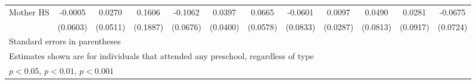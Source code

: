 \begin{table}[htbp]
\begin{tabular}{l*{11}{c}}
\addlinespace
Mother HS   &     -0.0005         &      0.0270         &      0.1606         &     -0.1062         &      0.0397         &      0.0665         &     -0.0601         &      0.0097         &      0.0490         &      0.0281         &     -0.0675         \\
            &    (0.0603)         &    (0.0511)         &    (0.1887)         &    (0.0676)         &    (0.0400)         &    (0.0578)         &    (0.0833)         &    (0.0287)         &    (0.0813)         &    (0.0917)         &    (0.0724)         \\
\bottomrule
\multicolumn{12}{l}{\footnotesize Standard errors in parentheses}\\
\multicolumn{12}{l}{\footnotesize Estimates shown are for individuals that attended any preschool, regardless of type}\\
\multicolumn{12}{l}{\footnotesize \sym{*} \(p<0.05\), \sym{**} \(p<0.01\), \sym{***} \(p<0.001\)}\\
\end{tabular}
\end{table}
